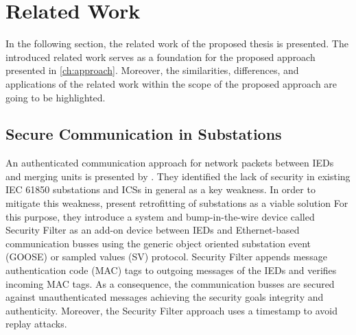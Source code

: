 \chapter{Related Work}
\label{ch:relatedwork}
In the following section, the related work of the proposed thesis is presented.
The introduced related work serves as a foundation for the proposed approach presented in \autoref{ch:approach}.
Moreover, the similarities, differences, and applications of the related work within the scope of the proposed approach are going to be highlighted.

\section{Secure Communication in Substations}
An authenticated communication approach for network packets between IEDs and merging units is presented by \citeauthor{Ishchenko2018} \cite{Ishchenko2018}.
They identified the lack of security in existing IEC 61850 substations and ICSs in general as a key weakness.
In order to mitigate this weakness, \citeauthor{Ishchenko2018} present retrofitting of substations as a viable solution
For this purpose, they introduce a system and bump-in-the-wire device called Security Filter as an add-on device between IEDs and Ethernet-based communication busses using the generic object oriented substation event (GOOSE) or sampled values (SV) protocol.
Security Filter appends message authentication code (MAC) tags to outgoing messages of the IEDs and verifies incoming MAC tags.
As a consequence, the communication busses are secured against unauthenticated messages achieving the security goals integrity and authenticity.
Moreover, the Security Filter approach uses a timestamp to avoid replay attacks.

